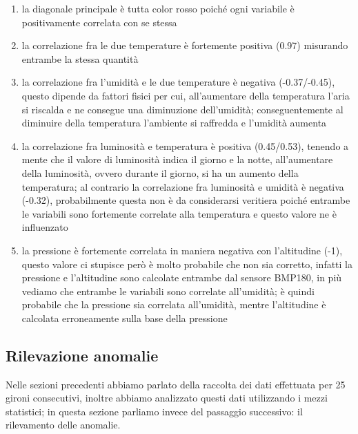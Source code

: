 \documentclass[a4paper, 12pt]{report}
\begin{document}
\begin{enumerate}
  \item la diagonale principale è tutta color rosso poiché ogni variabile è positivamente correlata con se stessa
  \item la correlazione fra le due temperature è fortemente positiva (0.97) misurando entrambe la stessa quantità
  \item la correlazione fra l'umidità e le due temperature è negativa (-0.37/-0.45), questo dipende da fattori fisici per cui, all'aumentare della temperatura l'aria si riscalda e ne consegue una diminuzione dell'umidità; 
  conseguentemente al diminuire della temperatura l'ambiente si raffredda e l'umidità aumenta
  \item la correlazione fra luminosità e temperatura è positiva (0.45/0.53), tenendo a mente che il valore di luminosità indica il giorno e la notte, all'aumentare della luminosità, ovvero durante il giorno, si ha un aumento
  della temperatura; al contrario la correlazione fra luminosità e umidità è negativa (-0.32), probabilmente questa non è da considerarsi veritiera poiché entrambe le variabili sono fortemente correlate alla temperatura e 
  questo valore ne è influenzato
  \item la pressione è fortemente correlata in maniera negativa con l'altitudine (-1), questo valore ci stupisce però è molto probabile che non sia corretto, infatti la pressione e l'altitudine sono calcolate
  entrambe dal sensore BMP180, in più vediamo che entrambe le variabili sono correlate all'umidità; è quindi probabile che la pressione sia correlata all'umidità, mentre l'altitudine è calcolata erroneamente sulla base 
  della pressione
\end{enumerate}

\subsection*{Rilevazione anomalie}
\vspace{0.5cm}

Nelle sezioni precedenti abbiamo parlato della raccolta dei dati effettuata per 25 gironi consecutivi, inoltre abbiamo analizzato questi dati utilizzando i mezzi statistici; in questa sezione parliamo invece del passaggio 
successivo: il rilevamento delle anomalie. 
\end{document}

